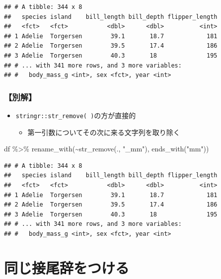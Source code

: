 \documentclass[
  xelatex,ja=standard, b5paper]{bxjsbook}
\newenvironment{Shaded}{\begin{snugshade}}{\end{snugshade}}
\newcommand{\FunctionTok}[1]{\textcolor[rgb]{0.00,0.00,0.00}{#1}}
\newcommand{\NormalTok}[1]{#1}
\newcommand{\SpecialCharTok}[1]{\textcolor[rgb]{0.00,0.00,0.00}{#1}}
\newcommand{\StringTok}[1]{\textcolor[rgb]{0.31,0.60,0.02}{#1}}
\providecommand{\tightlist}{%
  \setlength{\itemsep}{0pt}\setlength{\parskip}{0pt}}
\begin{document}
\begin{verbatim}
## # A tibble: 344 x 8
##   species island    bill_length bill_depth flipper_length
##   <fct>   <fct>           <dbl>      <dbl>          <int>
## 1 Adelie  Torgersen        39.1       18.7            181
## 2 Adelie  Torgersen        39.5       17.4            186
## 3 Adelie  Torgersen        40.3       18              195
## # ... with 341 more rows, and 3 more variables:
## #   body_mass_g <int>, sex <fct>, year <int>
\end{verbatim}

\hypertarget{ux5225ux89e3}{%
\subsubsection{【別解】}\label{ux5225ux89e3}}

\begin{itemize}
\tightlist
\item
  \texttt{stringr::str\_remove(\ )}の方が直接的

  \begin{itemize}
  \tightlist
  \item
    第一引数についてその次に来る文字列を取り除く
  \end{itemize}
\end{itemize}

\begin{Shaded}
\begin{Highlighting}[]
\NormalTok{df }\SpecialCharTok{\%\textgreater{}\%} 
  \FunctionTok{rename\_with}\NormalTok{(}\SpecialCharTok{\textasciitilde{}}\FunctionTok{str\_remove}\NormalTok{(., }\StringTok{"\_mm"}\NormalTok{),}
              \FunctionTok{ends\_with}\NormalTok{(}\StringTok{"mm"}\NormalTok{))}
\end{Highlighting}
\end{Shaded}

\begin{verbatim}
## # A tibble: 344 x 8
##   species island    bill_length bill_depth flipper_length
##   <fct>   <fct>           <dbl>      <dbl>          <int>
## 1 Adelie  Torgersen        39.1       18.7            181
## 2 Adelie  Torgersen        39.5       17.4            186
## 3 Adelie  Torgersen        40.3       18              195
## # ... with 341 more rows, and 3 more variables:
## #   body_mass_g <int>, sex <fct>, year <int>
\end{verbatim}

\hypertarget{rename-add}{%
\section{同じ接尾辞をつける}\label{rename-add}}
\end{document}
